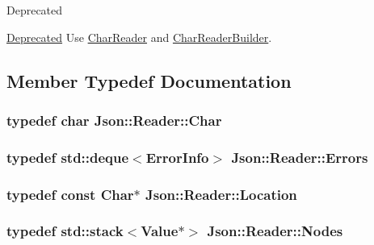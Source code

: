 \begin{DoxyRefDesc}{Deprecated}
\item[\hyperlink{deprecated__deprecated000005}{Deprecated}]Use \hyperlink{classJson_1_1CharReader}{Char\+Reader} and \hyperlink{classJson_1_1CharReaderBuilder}{Char\+Reader\+Builder}. \end{DoxyRefDesc}


\subsection{Member Typedef Documentation}
\subsubsection[{\texorpdfstring{Char}{Char}}]{\setlength{\rightskip}{0pt plus 5cm}typedef char {\bf Json\+::\+Reader\+::\+Char}}\hypertarget{classJson_1_1Reader_a3eec9118f3e9a672ba8348c3a79d0f45}{}\label{classJson_1_1Reader_a3eec9118f3e9a672ba8348c3a79d0f45}
\subsubsection[{\texorpdfstring{Errors}{Errors}}]{\setlength{\rightskip}{0pt plus 5cm}typedef std\+::deque$<${\bf Error\+Info}$>$ {\bf Json\+::\+Reader\+::\+Errors}\hspace{0.3cm}{\ttfamily [private]}}\hypertarget{classJson_1_1Reader_aae51e8f5bab3f067261c842a3ef858e5}{}\label{classJson_1_1Reader_aae51e8f5bab3f067261c842a3ef858e5}
\subsubsection[{\texorpdfstring{Location}{Location}}]{\setlength{\rightskip}{0pt plus 5cm}typedef const {\bf Char}$\ast$ {\bf Json\+::\+Reader\+::\+Location}}\hypertarget{classJson_1_1Reader_a46795b5b272bf79a7730e406cb96375a}{}\label{classJson_1_1Reader_a46795b5b272bf79a7730e406cb96375a}
\subsubsection[{\texorpdfstring{Nodes}{Nodes}}]{\setlength{\rightskip}{0pt plus 5cm}typedef std\+::stack$<${\bf Value}$\ast$$>$ {\bf Json\+::\+Reader\+::\+Nodes}\hspace{0.3cm}{\ttfamily [private]}}\hypertarget{classJson_1_1Reader_a8da2114fe8b8124d41ea2f3434f0171b}{}\label{classJson_1_1Reader_a8da2114fe8b8124d41ea2f3434f0171b}


